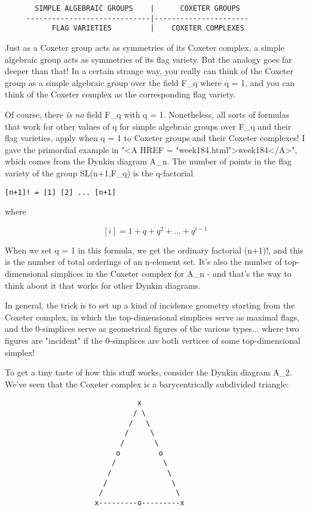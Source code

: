 \begin{verbatim}
       SIMPLE ALGEBRAIC GROUPS    |      COXETER GROUPS
     -----------------------------|----------------------
           FLAG VARIETIES         |    COXETER COMPLEXES
\end{verbatim}
    
Just as a Coxeter group acts as symmetries of its Coxeter complex,
a simple algebraic group acts as symmetries of its flag variety.  
But the analogy goes far deeper than that!  In a certain strange way, 
you really can think of the Coxeter group as a simple algebraic 
group over the field F_{q} where q = 1, and you can think of the Coxeter
complex as the corresponding flag variety.

Of course, there \emph{is no} field F_{q} with q = 1.  Nonetheless, all
sorts of formulas that work for other values of q for simple algebraic
groups over F_{q} and their flag varieties, apply when q = 1 to Coxeter
groups and their Coxeter complexes!  I gave the primordial example in
"<A HREF = "week184.html">week184</A>", which comes from the
Dynkin diagram A_{n}.  The number of points in the flag variety
of the group SL(n+1,F_{q}) is the q-factorial

\begin{verbatim}
[n+1]! = [1] [2] ... [n+1]
\end{verbatim}
    
where

$$
[i] = 1 + q + q^{2} + ... + q^{i-1}
$$
    
When we set q = 1 in this formula, we get the ordinary factorial
(n+1)!, and this is the number of total orderings of an n-element set.
It's also the number of top-dimensional simplices in the Coxeter 
complex for A_{n} - and that's the way to think about it that works for
other Dynkin diagrams.

In general, the trick is to set up a kind of incidence geometry starting
from the Coxeter complex, in which the top-dimensional simplices serve
as maximal flags, and the 0-simplices serve as geometrical figures of
the various types... where two figures are "incident" if the
0-simplices are both vertices of some top-dimensional simplex!

To get a tiny taste of how this stuff works, consider the Dynkin diagram
A_{2}.  We've seen that the Coxeter complex is a barycentrically
subdivided triangle:

\begin{verbatim}
                               x
                              / \
                             /   \
                            /     \
                           /       \
                          o         o
                         /           \
                        /             \
                       /               \
                      /                 \
                     x---------o---------x
\end{verbatim}
    
